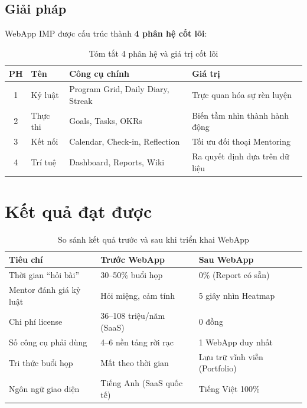 \subsection{Giải pháp}
WebApp IMP được cấu trúc thành \textbf{4 phân hệ cốt lõi}:

\begin{table}[H]
  \centering
  \begin{tabularx}{\textwidth}{|c|l|X|X|}
    \hline
    \rowcolor{pblue} \textbf{\color{white} PH} & \textbf{\color{white} Tên} & \textbf{\color{white} Công cụ chính} & \textbf{\color{white} Giá trị} \\ \hline
    1 & Kỷ luật & Program Grid, Daily Diary, Streak & Trực quan hóa sự rèn luyện \\ \hline
    2 & Thực thi & Goals, Tasks, OKRs & Biến tầm nhìn thành hành động \\ \hline
    3 & Kết nối & Calendar, Check-in, Reflection & Tối ưu đối thoại Mentoring \\ \hline
    4 & Trí tuệ & Dashboard, Reports, Wiki & Ra quyết định dựa trên dữ liệu \\ \hline
  \end{tabularx}
  \caption{Tóm tắt 4 phân hệ và giá trị cốt lõi}
\end{table}

\section{Kết quả đạt được}

\begin{table}[H]
  \centering
  \begin{tabularx}{\textwidth}{|l|X|X|}
    \hline
    \rowcolor{pblue} \textbf{\color{white} Tiêu chí} & \textbf{\color{white} Trước WebApp} & \textbf{\color{white} Sau WebApp} \\ \hline
    Thời gian ``hỏi bài'' & 30--50\% buổi họp & 0\% (Report có sẵn) \\ \hline
    Mentor đánh giá kỷ luật & Hỏi miệng, cảm tính & 5 giây nhìn Heatmap \\ \hline
    Chi phí license & 36--108 triệu/năm (SaaS) & 0 đồng \\ \hline
    Số công cụ phải dùng & 4--6 nền tảng rời rạc & 1 WebApp duy nhất \\ \hline
    Tri thức buổi họp & Mất theo thời gian & Lưu trữ vĩnh viễn (Portfolio) \\ \hline
    Ngôn ngữ giao diện & Tiếng Anh (SaaS quốc tế) & Tiếng Việt 100\% \\ \hline
  \end{tabularx}
  \caption{So sánh kết quả trước và sau khi triển khai WebApp}
\end{table}

